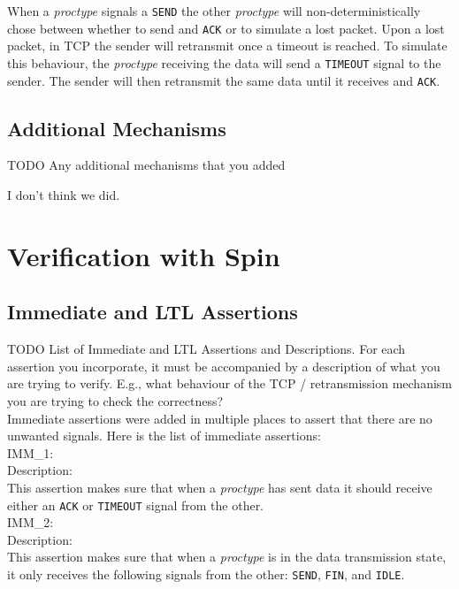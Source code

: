\documentclass{WigReport}
\begin{document}
When a \textit{proctype} signals a \verb|SEND| the other \textit{proctype} will non-deterministically chose between whether to send and \verb|ACK| or to simulate a lost packet. Upon a lost packet, in TCP the sender will retransmit once a timeout is reached. To simulate this behaviour, the \textit{proctype} receiving the data will send a \verb|TIMEOUT| signal to the sender. The sender will then retransmit the same data until it receives and \verb|ACK|.

\subsection{Additional Mechanisms}

TODO Any additional mechanisms that you added

I don't think we did.

\section{Verification with Spin}

\subsection{Immediate and LTL Assertions}

TODO List of Immediate and LTL Assertions and Descriptions. For each assertion you incorporate, it must be accompanied by a description of what you are trying to verify. E.g., what behaviour of the TCP / retransmission mechanism you are trying to check the correctness?
\\

Immediate assertions were added in multiple places to assert that there are no unwanted signals. Here is the list of immediate assertions:
\\

IMM\_1:\\
Description:\\
This assertion makes sure that when a \textit{proctype} has sent data it should receive either an \verb|ACK| or \verb|TIMEOUT| signal from the other.
\\

IMM\_2:\\
Description:\\
This assertion makes sure that when a \textit{proctype} is in the data transmission state, it only receives the following signals from the other: \verb|SEND|, \verb|FIN|, and \verb|IDLE|.
\\
\end{document}

